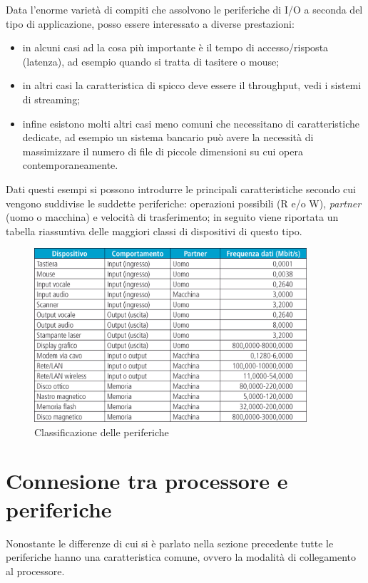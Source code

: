 \documentclass[class=book, crop=false, oneside]{standalone}
\begin{document}
Data l'enorme varietà di compiti che assolvono le periferiche di I/O a  seconda del tipo di applicazione, posso essere interessato a diverse prestazioni:
\begin{itemize}
	\item in alcuni casi ad la cosa più importante è il tempo di accesso/risposta (latenza), ad esempio quando si tratta di tasitere o mouse;
	\item in altri casi la caratteristica di spicco deve essere il throughput, vedi i sistemi di streaming;
	\item infine esistono molti altri casi meno comuni che necessitano di caratteristiche dedicate, ad esempio un sistema bancario può avere la necessità di massimizzare il numero di file di piccole dimensioni su cui opera contemporaneamente.
\end{itemize}

Dati questi esempi si possono introdurre le principali caratteristiche secondo cui vengono suddivise le suddette periferiche: operazioni possibili (R e/o W), \emph{partner} (uomo o macchina) e velocità di trasferimento; in seguito viene riportata un tabella riassuntiva delle maggiori classi di dispositivi di questo tipo.

\begin{figure}[H]
	\centering
	\includegraphics[width=0.9\textwidth,keepaspectratio]{classificazione-periferiche}
	\caption{Classificazione delle periferiche}
\end{figure}

\section{Connesione tra processore e periferiche}
Nonostante le differenze di cui si è parlato nella sezione precedente tutte le periferiche hanno una caratteristica comune, ovvero la modalità di collegamento al processore.
\end{document}
